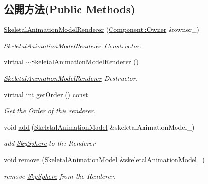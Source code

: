 \subsection*{公開方法(Public Methods)}
\begin{DoxyCompactItemize}
\item 
\hyperlink{class_i_dream_sky_1_1_skeletal_animation_model_renderer_a430001998f607f0dc57e8205d7139361}{Skeletal\+Animation\+Model\+Renderer} (\hyperlink{class_i_dream_sky_1_1_component_1_1_owner}{Component\+::\+Owner} \&owner\+\_\+)
\begin{DoxyCompactList}\small\item\em \hyperlink{class_i_dream_sky_1_1_skeletal_animation_model_renderer}{Skeletal\+Animation\+Model\+Renderer} Constructor. \end{DoxyCompactList}\item 
virtual \hyperlink{class_i_dream_sky_1_1_skeletal_animation_model_renderer_a387a91bf541ce763b8bd9cff33621020}{$\sim$\+Skeletal\+Animation\+Model\+Renderer} ()
\begin{DoxyCompactList}\small\item\em \hyperlink{class_i_dream_sky_1_1_skeletal_animation_model_renderer}{Skeletal\+Animation\+Model\+Renderer} Destructor. \end{DoxyCompactList}\item 
virtual int \hyperlink{class_i_dream_sky_1_1_skeletal_animation_model_renderer_a8427de8eabbb08c41f31d61497da604b}{get\+Order} () const 
\begin{DoxyCompactList}\small\item\em Get the Order of this renderer. \end{DoxyCompactList}\item 
void \hyperlink{class_i_dream_sky_1_1_skeletal_animation_model_renderer_ac1e3c632487b79bbafed2cba40a99e0e}{add} (\hyperlink{class_i_dream_sky_1_1_skeletal_animation_model}{Skeletal\+Animation\+Model} \&skeletal\+Animation\+Model\+\_\+)
\begin{DoxyCompactList}\small\item\em add \hyperlink{class_i_dream_sky_1_1_sky_sphere}{Sky\+Sphere} to the Renderer. \end{DoxyCompactList}\item 
void \hyperlink{class_i_dream_sky_1_1_skeletal_animation_model_renderer_a5cebe1d6df2478a3d0fbfcb7b676dbd6}{remove} (\hyperlink{class_i_dream_sky_1_1_skeletal_animation_model}{Skeletal\+Animation\+Model} \&skeletal\+Animation\+Model\+\_\+)
\begin{DoxyCompactList}\small\item\em remove \hyperlink{class_i_dream_sky_1_1_sky_sphere}{Sky\+Sphere} from the Renderer. \end{DoxyCompactList}\end{DoxyCompactItemize}
